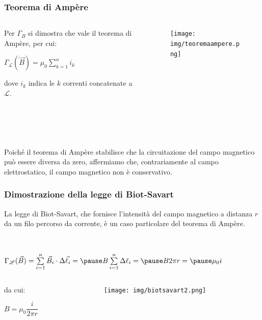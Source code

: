 \documentclass[]{beamer}
\theoremstyle{plain}
\begin{document}
\begin{frame}
\frametitle{Teorema di Ampère}
\begin{columns}
\begin{column}{0.5\textwidth}
Per $ \Gamma_B $ si dimostra che vale il \alert<1>{teorema di Ampère}, per cui:
\begin{center}
\colorbox{blue!30}{$ \Gamma_\mathscr{L} (\vec{B}) = \mu_0 \sum\limits_{k=1}^n i_k $}
\end{center}
dove $ i_k $ indica le $ k $ correnti concatenate a $ \mathscr{L} $.\pause
\end{column}
\begin{column}{0.4\textwidth}
\begin{figure}
\texttt{[image: img/teoremaampere.png]}
\end{figure}
\end{column}
\end{columns}

~

~
   
Poiché il teorema di Ampère stabilisce che la circuitazione del campo magnetico può essere diversa da zero, affermiamo che, contrariamente al campo elettrostatico, \alert<2>{il campo magnetico non è conservativo}.
\end{frame}

\begin{frame}
\frametitle{Dimostrazione della legge di Biot-Savart}
\alert<1>{La legge di Biot-Savart}, che fornisce l'intensità del campo magnetico a distanza $ r $ da un filo percorso da corrente, \alert<1>{è un caso particolare del teorema di Ampère}.\pause

~

\begin{center}
$ \Gamma_\mathscr{L} (\vec{B}) = \sum\limits_{i=1}^n \vec{B}_i \cdot \Delta \vec{\ell}_i = \pause B \sum\limits_{i=1}^n \Delta \ell_i =\pause B 2 \pi r =\pause \mu_0 i $\pause
\end{center}
\begin{columns}
\begin{column}{0.4\textwidth}
da cui:
\begin{center}
\colorbox{blue!30}{$ B = \mu_0 \dfrac{i}{2\pi r} $}
\end{center}
\end{column}
\begin{column}{0.4\textwidth}
\begin{figure}
\texttt{[image: img/biotsavart2.png]}
\end{figure}
\end{column}
\end{columns}
\end{frame}
\end{document}
